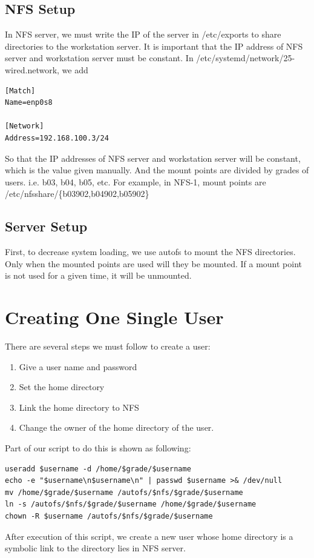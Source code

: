 \documentclass{article}
\begin{document}
\subsection{NFS Setup}
In NFS server, we must write the IP of the server in {\cs /etc/exports} to share directories to the workstation server.
It is important that the IP address of NFS server and workstation server must be constant.
In {\cs /etc/systemd/network/25-wired.network}, we add \\
\begin{verbatim}
[Match]
Name=enp0s8

[Network]
Address=192.168.100.3/24
\end{verbatim}
So that the IP addresses of NFS server and workstation server will be constant, which is the value given manually.
And the mount points are divided by grades of users. i.e. b03, b04, b05, etc. For example, in NFS-1, mount points are
{\cs /etc/nfsshare/\{b03902,b04902,b05902\}}
\subsection{Server Setup}
First, to decrease system loading, we use {\cs autofs} to mount the NFS directories. Only when the mounted points are used will they be mounted. 
If a mount point is not used for a given time, it will be unmounted. 

\section{Creating One Single User}
There are several steps we must follow to create a user:
   \begin{enumerate}
   \item Give a user name and password
   \item Set the home directory
   \item Link the home directory to NFS
   \item Change the owner of the home directory of the user.
   \end{enumerate}
Part of our script to do this is shown as following:
\begin{framed}
\begin{verbatim}
useradd $username -d /home/$grade/$username
echo -e "$username\n$username\n" | passwd $username >& /dev/null
mv /home/$grade/$username /autofs/$nfs/$grade/$username
ln -s /autofs/$nfs/$grade/$username /home/$grade/$username
chown -R $username /autofs/$nfs/$grade/$username
\end{verbatim}
\end{framed}
After execution of this script, we create a new user whose home directory is a symbolic link to the directory lies in NFS server.
\end{document}

